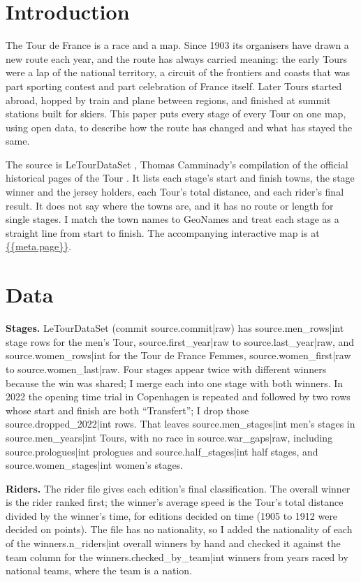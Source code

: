 \documentclass[11pt,a4paper]{article}
\begin{document}
\section{Introduction}
The Tour de France is a race and a map. Since 1903 its organisers have drawn a new route each year, and the route has always carried meaning: the early Tours were a lap of the national territory, a circuit of the frontiers and coasts that was part sporting contest and part celebration of France itself. Later Tours started abroad, hopped by train and plane between regions, and finished at summit stations built for skiers. This paper puts every stage of every Tour on one map, using open data, to describe how the route has changed and what has stayed the same.

The source is LeTourDataSet \citep{ltd}, Thomas Camminady's compilation of the official historical pages of the Tour \citep{letour}. It lists each stage's start and finish towns, the stage winner and the jersey holders, each Tour's total distance, and each rider's final result. It does not say where the towns are, and it has no route or length for single stages. I match the town names to GeoNames \citep{geonames} and treat each stage as a straight line from start to finish. The accompanying interactive map is at \url{{{meta.page}}}.

\section{Data}
\textbf{Stages.} LeTourDataSet (commit {{source.commit|raw}}) has {{source.men_rows|int}} stage rows for the men's Tour, {{source.first_year|raw}} to {{source.last_year|raw}}, and {{source.women_rows|int}} for the Tour de France Femmes, {{source.women_first|raw}} to {{source.women_last|raw}}. Four stages appear twice with different winners because the win was shared; I merge each into one stage with both winners. In 2022 the opening time trial in Copenhagen is repeated and followed by two rows whose start and finish are both ``Transfert''; I drop those {{source.dropped_2022|int}} rows. That leaves {{source.men_stages|int}} men's stages in {{source.men_years|int}} Tours, with no race in {{source.war_gaps|raw}}, including {{source.prologues|int}} prologues and {{source.half_stages|int}} half stages, and {{source.women_stages|int}} women's stages.

\textbf{Riders.} The rider file gives each edition's final classification. The overall winner is the rider ranked first; the winner's average speed is the Tour's total distance divided by the winner's time, for editions decided on time (1905 to 1912 were decided on points). The file has no nationality, so I added the nationality of each of the {{winners.n_riders|int}} overall winners by hand and checked it against the team column for the {{winners.checked_by_team|int}} winners from years raced by national teams, where the team is a nation.
\end{document}
